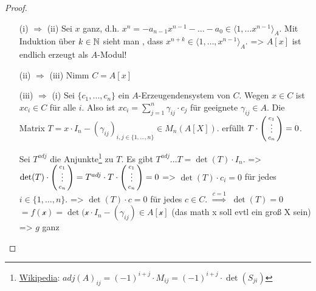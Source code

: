\documentclass[../main.tex]{subfiles}
\begin{document}
\begin{proof}$ $
    \begin{itemize}
        \item[(i) $\Rightarrow$ (ii)]
        Sei $x$ ganz, d.h. $x^n = -a_{n-1}x^{n-1}-\dots - a_0\in \langle1,\dots x^{n-1}\rangle_A$.
        Mit Induktion über $k\in \mathbb{N}$ sieht man , dass $x^{n+k}\in \langle 1,\dots, x^{n-1}\rangle_A$.
        => $A[x]$ ist endlich erzeugt als $A$-Modul!
        \item[(ii) $\Rightarrow$ (iii)]
        Nimm $C = A[x]$
        \item[(iii) $\Rightarrow$ (i)]
        Sei $\{c_1,\dots,c_n\}$ ein $A$-Erzeugendensystem von $C$.
        Wegen $x\in C$ ist $xc_i\in C$ für alle $i$.
        Also ist $xc_i= \sum_{j=1}^n \gamma_{ij}\cdot c_j$ für geeignete $\gamma_{ij}\in A$.
        Die Matrix $T = x\cdot I_n- (\gamma_{ij})_{i,j\in \{1,\dots,n\}}\in M_n(A[X])$.
        erfüllt $T\cdot \begin{psmallmatrix}
            c_1\\
            \vphantom{\int\limits^x}\smash{\vdots}\\
            c_n
        \end{psmallmatrix} = 0$.

        Sei $T^{adj}$ die Anjunkte\footnote{\href{https://de.wikipedia.org/wiki/Adjunkte}{Wikipedia}: $adj(A)_{ij} = (-1)^{i+j} \cdot M_{ij} = (-1)^{i+j}\cdot \det(S_{ji})$} zu $T$.
        Es gibt $T^{adj}\dots T = \det(T)\cdot I_n$.
        => $\det(T)\cdot \begin{psmallmatrix}
            c_1\\
            \vphantom{\int\limits^x}\smash{\vdots}\\
            c_n
        \end{psmallmatrix} = T^{adj} \cdot T\cdot \begin{psmallmatrix}
            c_1\\
            \vphantom{\int\limits^x}\smash{\vdots}\\
            c_n
        \end{psmallmatrix} = 0$
        => $\det(T)\cdot c_i = 0$ für jedes $i\in \{1,\dots,n\}$.
        => $\det(T)\cdot c = 0$ für jedes $c\in C$.
        $\overset{c=1}{\Rightarrow}$ $\det(T) = 0$
        $= f(\mathcal{x}) = \det(\mathcal{x}\cdot I_n - (\gamma_{ij})\in A[\mathcal{x}]$ (das math x soll evtl ein groß X sein)
        => $g$ ganz
    \end{itemize}
\end{proof}
\end{document}
